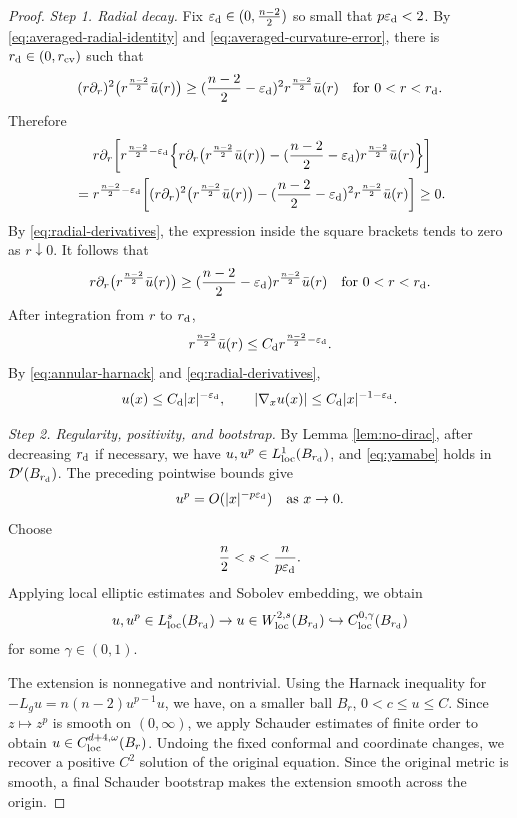 \documentclass[11pt]{article}
\numberwithin{equation}{section}
\theoremstyle{remark}
\newcommand{\pa}{\partial}
\begin{document}
\par
\begin{proof}
\emph{Step 1. Radial decay.}
Fix \(\varepsilon_{\rm d}\in(0,\frac{n-2}{2})\) so small that
\(p\varepsilon_{\rm d}<2\). By
\eqref{eq:averaged-radial-identity} and
\eqref{eq:averaged-curvature-error}, there is
\(r_{\rm d}\in(0,r_{\rm cv})\) such that
\[
 (r\pa_r)^2\bigl(r^{\frac{n-2}{2}}\bar u(r)\bigr)
 \ge(\frac{n-2}{2}-\varepsilon_{\rm d})^2r^{\frac{n-2}{2}}\bar u(r)
 \quad\text{for }0<r<r_{\rm d}.
\]
Therefore
{
\[
 \begin{aligned}
 &r\pa_r\bigg[
 r^{\frac{n-2}{2}-\varepsilon_{\rm d}}\Bigl\{
 r\pa_r\bigl(r^{\frac{n-2}{2}}\bar u(r)\bigr)
 -(\frac{n-2}{2}-\varepsilon_{\rm d})r^{\frac{n-2}{2}}\bar u(r)
 \Bigr\}
 \bigg]\\
{}={}&
 r^{\frac{n-2}{2}-\varepsilon_{\rm d}}\bigg[
 (r\pa_r)^2\bigl(r^{\frac{n-2}{2}}\bar u(r)\bigr)
 -(\frac{n-2}{2}-\varepsilon_{\rm d})^2
 r^{\frac{n-2}{2}}\bar u(r)
 \bigg]\ge0.
 \end{aligned}
\]
}
By \eqref{eq:radial-derivatives}, the expression inside the square brackets
tends to zero as \(r\downarrow0\).  It follows that
\[
 r\pa_r\bigl(r^{\frac{n-2}{2}}\bar u(r)\bigr)
 \ge(\frac{n-2}{2}-\varepsilon_{\rm d})r^{\frac{n-2}{2}}\bar u(r)
 \quad\text{for }0<r<r_{\rm d}.
\]
After integration from \(r\) to \(r_{\rm d}\),
\[
 r^{\frac{n-2}{2}}\bar u(r)\le C_{\rm d}r^{\frac{n-2}{2}-\varepsilon_{\rm d}}.
\]
{By \eqref{eq:annular-harnack} and
\eqref{eq:radial-derivatives},
\[
 u(x)\le C_{\rm d}|x|^{-\varepsilon_{\rm d}},
 \qquad
 |\nabla_xu(x)|\le C_{\rm d}|x|^{-1-\varepsilon_{\rm d}}.
\]
}

{
\emph{Step 2. Regularity, positivity, and bootstrap.}
By Lemma  \ref{lem:no-dirac}, after decreasing \(r_{\rm d}\) if necessary,
we have \(u,u^p\in L^1_{\mathrm{loc}}(B_{r_{\rm d}})\), and
\eqref{eq:yamabe} holds in \(\mathcal D'(B_{r_{\rm d}})\). The preceding
pointwise bounds give
\[
 u^p=O(|x|^{-p\varepsilon_{\rm d}})
 \quad\text{as }x\to0.
\]
}
Choose
\[
 \frac n2<s<\frac{n}{p\varepsilon_{\rm d}}.
\]
{Applying local elliptic estimates and Sobolev embedding,
we obtain}
\[
 u,u^p\in L^s_{\rm loc}(B_{r_{\rm d}})
 \to
 u\in W^{2,s}_{\rm loc}(B_{r_{\rm d}})
 \hookrightarrow C^{0,\gamma}_{\rm loc}(B_{r_{\rm d}})
\]
for some \(\gamma\in(0,1)\).

The extension is nonnegative and nontrivial.
Using the Harnack inequality for
\(-L_gu=n(n-2)u^{p-1}u\), we have, on a smaller ball \(B_r\), \(0<c\le u\le C\).
Since \(z\mapsto z^p\) is smooth on \((0,\infty)\), we apply
Schauder estimates of finite order to obtain \(u\in C_{\rm loc}^{d+4,\omega}(B_r)\).
Undoing the fixed conformal and coordinate changes, we recover
a positive \(C^2\) solution of the original equation. Since the original
metric is smooth, a final Schauder bootstrap makes the extension smooth
across the origin.
\end{proof}
\end{document}
